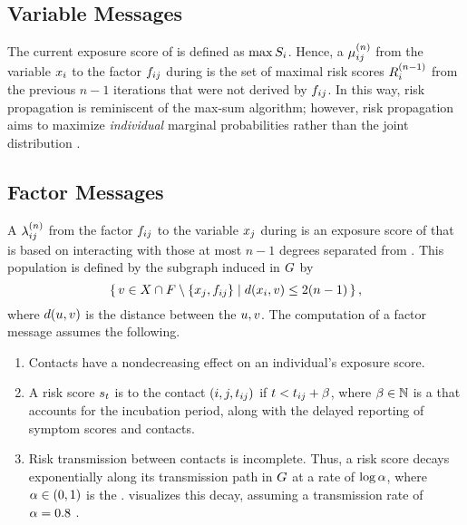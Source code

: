 \subsection{Variable Messages}

The current exposure score of  is defined as $\max S_i$. Hence, a  $\mu_{ij}^{(n)}$ from the variable \vertexName $\vVariable[i]$ to the factor \vertexName $\vFactor[ij]$ during  is the set of maximal risk scores $R_{i}^{(n - 1)}$ from the previous $n - 1$ iterations that were not derived by $\vFactor[ij]$. In this way, risk propagation is reminiscent of the max-sum algorithm; however, risk propagation aims to maximize \emph{individual} marginal probabilities rather than the joint distribution \cite[pp. 411--415]{Bishop2006}.

\subsection{Factor Messages}

A  $\lambda_{ij}^{(n)}$ from the factor \vertexName $\vFactor[ij]$ to the variable \vertexName $\vVariable[j]$ during  is an exposure score of  that is based on interacting with those at most $n - 1$ degrees separated from . This population is defined by the subgraph induced in $G$ by
\begin{equation*}
  \setBuilder{\vVertex \in \vVariables \cap \vFactors \setminus \{\vVariable[j], \vFactor[ij]\}}{\dist(\vVariable[i], \vVertex) \leq 2(n - 1)},
\end{equation*}
where $d(u, v)$ is the distance between the \verticesName $u, v$. The computation of a factor message assumes the following.
\begin{enumerate}
  \item Contacts have a nondecreasing effect on an individual's exposure score.
  \item A risk score $s_t$ is  to the contact $(i, j, t_{ij})$ if $t < t_{ij} +\beta$, where $\beta \in \mathbb{N}$ is a  that accounts for the incubation period, along with the delayed reporting of symptom scores and contacts.
  \item Risk transmission between contacts is incomplete. Thus, a risk score decays exponentially along its transmission path in $G$ at a rate of $\log \alpha$, where $\alpha \in (0, 1)$ is the .  visualizes this decay, assuming a transmission rate of $\alpha = 0.8$ \citep{Hamner2020}.\end{enumerate}

